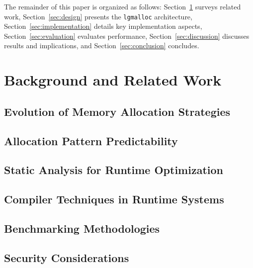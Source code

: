 \documentclass[sigconf,authordraft]{acmart}
\begin{document}
The remainder of this paper is organized as follows: Section~\ref{sec:background}
surveys related work, Section~\ref{sec:design} presents the \texttt{lgmalloc}
architecture, Section~\ref{sec:implementation} details key implementation aspects,
Section~\ref{sec:evaluation} evaluates performance, Section~\ref{sec:discussion}
discusses results and implications, and Section~\ref{sec:conclusion} concludes.

\section{Background and Related Work}
\label{sec:background}

\subsection{Evolution of Memory Allocation Strategies}

\subsection{Allocation Pattern Predictability}

\subsection{Static Analysis for Runtime Optimization}

\subsection{Compiler Techniques in Runtime Systems}

\subsection{Benchmarking Methodologies}

\subsection{Security Considerations}
\end{document}
